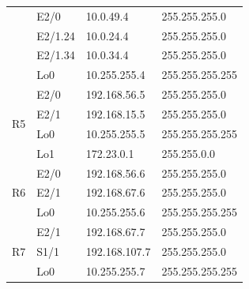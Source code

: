 \documentclass[12pt,twoside,a4paper]{report}
\begin{document}
\begin{table}[!htbp]
\begin{tabular}{|c|l|l|l|}
                     & E2/0                                    & 10.0.49.4                               & 255.255.255.0                       \\ \cline{2-4} 
                     & E2/1.24                                 & 10.0.24.4                               & 255.255.255.0                       \\ \cline{2-4} 
                     & E2/1.34                                 & 10.0.34.4                               & 255.255.255.0                       \\ \cline{2-4} 
                     & Lo0                                     & 10.255.255.4                            & 255.255.255.255                     \\ \hline
\multirow{4}{*}{R5}  & E2/0                                    & 192.168.56.5                            & 255.255.255.0                       \\ \cline{2-4} 
                     & E2/1                                    & 192.168.15.5                            & 255.255.255.0                       \\ \cline{2-4} 
                     & Lo0                                     & 10.255.255.5                            & 255.255.255.255                     \\ \cline{2-4} 
                     & Lo1                                     & 172.23.0.1                              & 255.255.0.0                         \\ \hline
\multirow{3}{*}{R6}  & E2/0                                    & 192.168.56.6                            & 255.255.255.0                       \\ \cline{2-4} 
                     & E2/1                                    & 192.168.67.6                            & 255.255.255.0                       \\ \cline{2-4} 
                     & Lo0                                     & 10.255.255.6                            & 255.255.255.255                     \\ \hline
\multirow{3}{*}{R7}  & E2/1                                    & 192.168.67.7                            & 255.255.255.0                       \\ \cline{2-4} 
                     & S1/1                                    & 192.168.107.7                           & 255.255.255.0                       \\ \cline{2-4} 
                     & Lo0                                     & 10.255.255.7                            & 255.255.255.255                     \\ \hline

\end{tabular}
\end{table}
\end{document}
